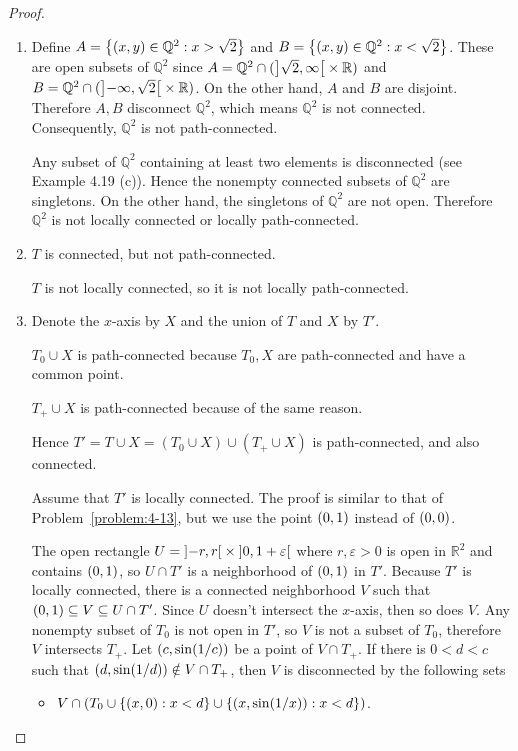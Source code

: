 \begin{proof}
	\begin{enumerate}[label={(\alph*)}]
		\item Define $A = \left\{{ \left({x, y}\right)\in \mathbb{Q}^{2} : x > \sqrt{2} }\right\}$ and $B = \left\{{ \left({x, y}\right)\in \mathbb{Q}^{2} : x < \sqrt{2} }\right\}$. These are open subsets of $\mathbb{Q}^{2}$ since $A = \mathbb{Q}^{2} \cap (\left]{\sqrt{2}, \infty}\right[ \times \mathbb{R})$ and $B = \mathbb{Q}^{2} \cap (\left]{-\infty, \sqrt{2}}\right[ \times \mathbb{R})$. On the other hand, $A$ and $B$ are disjoint. Therefore $A, B$ disconnect $\mathbb{Q}^{2}$, which means $\mathbb{Q}^{2}$ is not connected. Consequently, $\mathbb{Q}^{2}$ is not path-connected.

		      Any subset of $\mathbb{Q}^{2}$ containing at least two elements is disconnected (see Example 4.19 (c)). Hence the nonempty connected subsets of $\mathbb{Q}^{2}$ are singletons. On the other hand, the singletons of $\mathbb{Q}^{2}$ are not open. Therefore $\mathbb{Q}^{2}$ is not locally connected or locally path-connected.
		\item $T$ is connected, but not path-connected.

		      $T$ is not locally connected, so it is not locally path-connected.
		\item Denote the $x$-axis by $X$ and the union of $T$ and $X$ by $T'$.

		      $T_{0} \cup X$ is path-connected because $T_{0}, X$ are path-connected and have a common point.

		      $T_{+}\cup X$ is path-connected because of the same reason.

		      Hence $T' = T\cup X = (T_{0} \cup X)\cup (T_{+}\cup X)$ is path-connected, and also connected.

		      Assume that $T'$ is locally connected. The proof is similar to that of Problem~\ref{problem:4-13}, but we use the point $\left({0,1}\right)$ instead of $\left({0,0}\right)$.

		      The open rectangle $U = \left]{-r, r}\right[ \times \left]{0, 1+\varepsilon}\right[$ where $r, \varepsilon > 0$ is open in $\mathbb{R}^{2}$ and contains $\left({0,1}\right)$, so $U \cap T'$ is a neighborhood of $\left({0,1}\right)$ in $T'$. Because $T'$ is locally connected, there is a connected neighborhood $V$ such that $\left({0,1}\right)\subseteq V \subseteq U\cap T'$. Since $U$ doesn't intersect the $x$-axis, then so does $V$. Any nonempty subset of $T_{0}$ is not open in $T'$, so $V$ is not a subset of $T_{0}$, therefore $V$ intersects $T_{+}$. Let $\left({c, \sin(1/c)}\right)$ be a point of $V\cap T_{+}$. If there is $0 < d < c$ such that $\left({d, \sin(1/d)}\right) \notin V\cap T_{+}$, then $V$ is disconnected by the following sets
		      \begin{itemize}
			      \item $V \cap (T_{0} \cup \left\{{ \left({x,0}\right) : x < d }\right\} \cup \left\{{ \left({x, \sin(1/x)}\right) : x < d }\right\})$.


\end{itemize}
\end{enumerate}
\end{proof}
